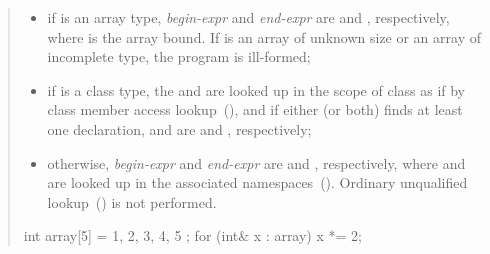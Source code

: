 \begin{quote}
\begin{itemize}
\item if  is an array type, \textit{begin-expr} and \textit{end-expr} are
 and , respectively, where  is
the array bound. If  is an array of unknown size or an array of
incomplete type, the program is ill-formed;

\item if  is a class type, the 
 and  are looked up in the scope of class 
as if by class member access lookup~(), and if either
(or both) finds at least one declaration,  and
 are  and ,
respectively;

\item otherwise, \textit{begin-expr} and \textit{end-expr} are 
and , respectively, where  and  are looked
up in the associated namespaces~().
\enternote Ordinary unqualified lookup~() is not
performed. \exitnote
\end{itemize}

\enterexample
\begin{codeblock}
int array[5] = { 1, 2, 3, 4, 5 };
for (int& x : array)
  x *= 2;
\end{codeblock}
\exitexample%

\end{quote}
